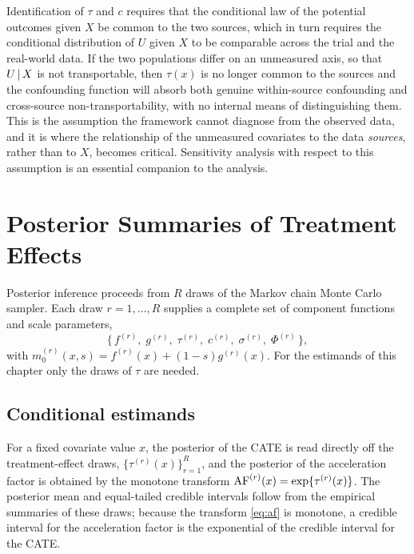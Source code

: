 \begin{remark}
\label{rem:transport-U}
Identification of $\tau$ and $c$ requires that the conditional law of the
potential outcomes given $X$ be common to the two sources, which in turn
requires the conditional distribution of $U$ given $X$ to be comparable across
the trial and the real-world data. If the two populations differ on an
unmeasured axis, so that $U \,\vert\, X$ is not transportable, then $\tau(x)$ is no
longer common to the sources and the confounding function will absorb both
genuine within-source confounding and cross-source non-transportability, with no
internal means of distinguishing them. This is the assumption the framework
cannot diagnose from the observed data, and it is where the relationship of the
unmeasured covariates to the data \emph{sources}, rather than to $X$, becomes
critical. Sensitivity analysis with respect to this assumption is an essential
companion to the analysis.
\end{remark}

\section{Posterior Summaries of Treatment Effects}
\label{sec:pi-summaries}

Posterior inference proceeds from $R$ draws of the Markov chain Monte Carlo
sampler. Each draw $r = 1, \dots, R$ supplies a complete set of component
functions and scale parameters,
\[
\bigl\{\, f^{(r)},\; g^{(r)},\; \tau^{(r)},\; c^{(r)},\; \sigma^{(r)},\;
\Phi^{(r)} \,\bigr\},
\]
with $m_0^{(r)}(x, s) = f^{(r)}(x) + (1-s) g^{(r)}(x)$. For the estimands of this
chapter only the draws of $\tau$ are needed.

\subsection{Conditional estimands}

For a fixed covariate value $x$, the posterior of the CATE is read directly off
the treatment-effect draws, $\{\tau^{(r)}(x)\}_{r=1}^{R}$, and the posterior of
the acceleration factor is obtained by the monotone transform
$\mathrm{AF}^{(r)}(x) = \exp\{\tau^{(r)}(x)\}$. The posterior mean and equal-tailed
credible intervals follow from the empirical summaries of these draws; because
the transform \eqref{eq:af} is monotone, a credible interval for the
acceleration factor is the exponential of the credible interval for the CATE.

